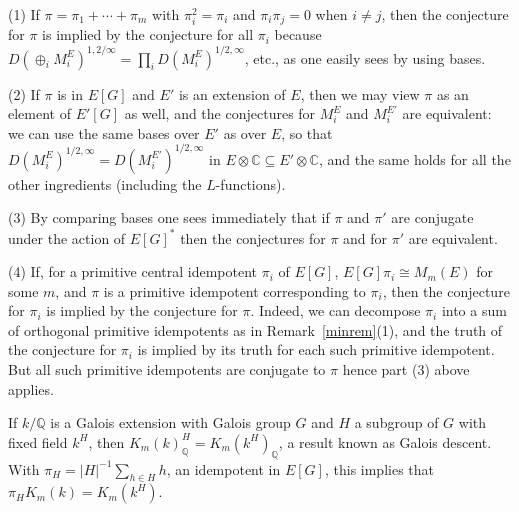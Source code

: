 \documentclass{amsart}
\begin{document}
\begin{remark}\label{consequencesremark}
(1)
If $ \pi = \pi_1 + \cdots + \pi_m $ with $ \pi_i^2 = \pi_i $ and $ \pi_i \pi_j = 0 $
when $ i \neq j $, then the conjecture for $ \pi $ is implied by the conjecture for all $ \pi_i $ because
$ D(\oplus_i M_i^E)^{1,2/\infty} = \prod_i D(M_i^E)^{1/2,\infty} $, etc., as one easily sees by using bases.

(2)
If $ \pi $ is in $ E[G] $ and $ E' $ is an extension of $ E $, then we may view $ \pi $ as an element
of $ E'[G] $ as well, and the conjectures for $ M_i^E $ and $ M_i^{E'} $ are equivalent:
we can use the same bases over $ E' $ as over $ E $, so that $ D(M_i^E)^{1/2,\infty} =  D(M_i^{E'})^{1/2,\infty} $
in $ E {\otimes} {\mathbb C} \subseteq E' {\otimes} {\mathbb C} $, and the same holds for all the other ingredients (including
the $ L $-functions).

(3)
By comparing bases one sees immediately that
if $ \pi $ and $ \pi' $ are conjugate under the action of $ E[G]^* $ then
the conjectures for $ \pi $ and for $ \pi' $ are equivalent.

(4)
If, for a primitive central idempotent $ \pi_i $ of $ E[G] $, $ E[G] \pi_i {\cong} M_m(E) $ for some $ m $,
and $ \pi $ is a primitive idempotent corresponding to $ \pi_i $, then the conjecture for $ \pi_i $ is implied
by the conjecture for $ \pi $.
Indeed, we can decompose $ \pi_i $ into a sum of orthogonal primitive idempotents
as in Remark~\ref{minrem}(1), and the truth of the conjecture for $ \pi_i $ is implied by its truth
for each such primitive idempotent.  But all such primitive idempotents are conjugate to $ \pi $
hence part (3) above applies.
\end{remark}

\begin{remark}\label{galoisdescent}
If $ k/{\mathbb Q} $ is a Galois extension with Galois group $ G $ and $ H $ a subgroup of $ G $ with fixed field $ k^H $,  then
$ K_m(k)_{\mathbb Q}^H = K_m(k^H)_{\mathbb Q}  $, a result known as Galois descent.
With $ \pi_H = |H|^{-1} \sum_{h \in H} h $, an idempotent in $ E[G] $, this implies that $ \pi_H K_m(k) = K_m(k^H) $.
\end{remark}
\end{document}
